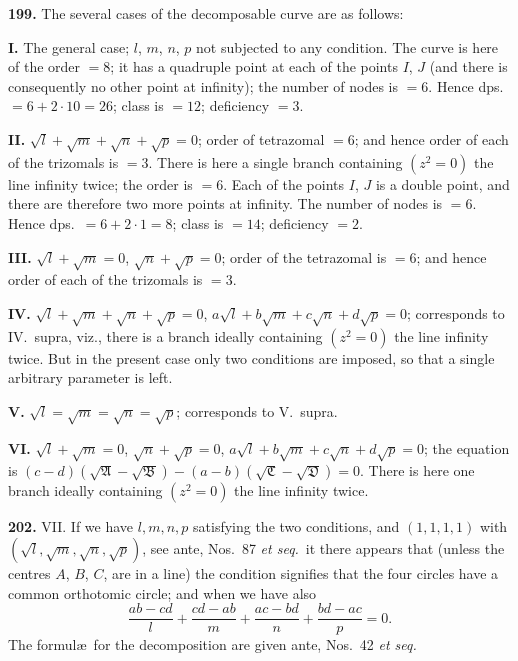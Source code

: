 \documentclass[12pt,a4paper]{article}
\theoremstyle{definition}
\begin{document}
\newpage
\noindent\textbf{199.} The several cases of the decomposable curve are as follows:

\noindent\textbf{I.} The general case; $l$, $m$, $n$, $p$ not subjected to any condition. The curve
is here of the order $= 8$; it has a quadruple point at each of the points $I$, $J$ (and
there is consequently no other point at infinity); the number of nodes is $= 6$. Hence
dps.\ $= 6 + 2 \cdot 10 = 26$; class is $= 12$; deficiency $= 3$.

\noindent\textbf{II.} $\sqrt{l} + \sqrt{m} + \sqrt{n} + \sqrt{p} = 0$; order of tetrazomal $= 6$; and hence
order of each of the trizomals is $= 3$. There is here a single branch containing
$(z^2 = 0)$ the line infinity twice; the order is $= 6$. Each of the points $I$, $J$ is a double
point, and there are therefore two more points at infinity. The number of nodes is
$= 6$. Hence dps.\ $= 6 + 2 \cdot 1 = 8$; class is $= 14$; deficiency $= 2$.

\noindent\textbf{III.} $\sqrt{l} + \sqrt{m} = 0$, $\sqrt{n} + \sqrt{p} = 0$; order of the tetrazomal is $= 6$; and
hence order of each of the trizomals is $= 3$.

\noindent\textbf{IV.} $\sqrt{l} + \sqrt{m} + \sqrt{n} + \sqrt{p} = 0$, $a\sqrt{l} + b\sqrt{m} + c\sqrt{n} + d\sqrt{p} = 0$;
corresponds to IV.\ supra, viz., there is a branch ideally containing $(z^2 = 0)$ the line
infinity twice. But in the present case only two conditions are imposed, so that a
single arbitrary parameter is left.

\noindent\textbf{V.} $\sqrt{l} = \sqrt{m} = \sqrt{n} = \sqrt{p}$; corresponds to V.\ supra.

\noindent\textbf{VI.} $\sqrt{l} + \sqrt{m} = 0$, $\sqrt{n} + \sqrt{p} = 0$, $a\sqrt{l} + b\sqrt{m} + c\sqrt{n} + d\sqrt{p} = 0$;
the equation is $(c - d)(\sqrt{\mathfrak{A}} - \sqrt{\mathfrak{B}}) - (a - b)(\sqrt{\mathfrak{C}} - \sqrt{\mathfrak{D}}) = 0$.
There is here one branch ideally containing $(z^2 = 0)$ the line infinity twice.

\newpage
\noindent\textbf{202.} VII. If we have $l, m, n, p$ satisfying the two conditions, and $(1, 1, 1, 1)$
with $(\sqrt{l}, \sqrt{m}, \sqrt{n}, \sqrt{p})$, see ante, Nos.~87 \textit{et seq.}\ it there appears that (unless
the centres $A$, $B$, $C$, are in a line) the condition signifies that the four circles have a
common orthotomic circle; and when we have also
\[
\frac{ab - cd}{l} + \frac{cd - ab}{m} + \frac{ac - bd}{n} + \frac{bd - ac}{p} = 0.
\]
The formul\ae\ for the decomposition are given ante, Nos.~42 \textit{et seq.}
\end{document}
